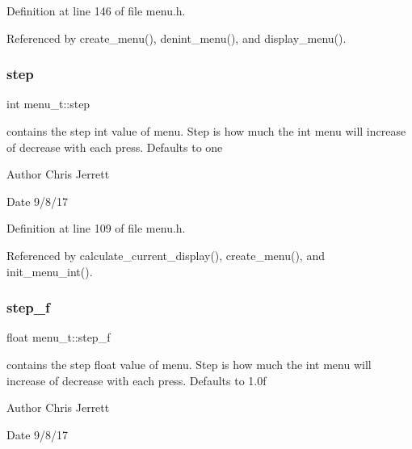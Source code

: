 Definition at line 146 of file menu.\+h.



Referenced by create\+\_\+menu(), denint\+\_\+menu(), and display\+\_\+menu().

\mbox{\label{structmenu__t_adc50450bc59ea66a8d67424adc46e24e}} 
\subsubsection{\texorpdfstring{step}{step}}
{\footnotesize\ttfamily int menu\+\_\+t\+::step}



contains the step int value of menu. Step is how much the int menu will increase of decrease with each press. Defaults to one 

\begin{DoxyAuthor}{Author}
Chris Jerrett 
\end{DoxyAuthor}
\begin{DoxyDate}{Date}
9/8/17 
\end{DoxyDate}


Definition at line 109 of file menu.\+h.



Referenced by calculate\+\_\+current\+\_\+display(), create\+\_\+menu(), and init\+\_\+menu\+\_\+int().

\mbox{\label{structmenu__t_a84cfd9226f6554c63ca9f4b11f94d12d}} 
\subsubsection{\texorpdfstring{step\+\_\+f}{step\_f}}
{\footnotesize\ttfamily float menu\+\_\+t\+::step\+\_\+f}



contains the step float value of menu. Step is how much the int menu will increase of decrease with each press. Defaults to 1.\+0f 

\begin{DoxyAuthor}{Author}
Chris Jerrett 
\end{DoxyAuthor}
\begin{DoxyDate}{Date}
9/8/17 
\end{DoxyDate}


